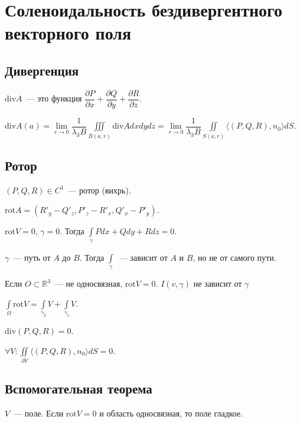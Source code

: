 \documentclass{article}
\begin{document}
    \newpage
    
    \section{Соленоидальность бездивергентного векторного поля}
    
        \subsection{Дивергенция}
    
            $\mathrm{div} A$~--- это функция $\dfrac{\partial P}{\partial x} + \dfrac{\partial Q}{\partial y} + \dfrac{\partial R}{\partial z}$.
        
            $\mathrm{div} A(a) = \lim\limits_{r \rightarrow 0} \dfrac{1}{\lambda_3 B} \iiint\limits_{B(a, r)} \mathrm{div} A dx dy dz = \lim\limits_{r \rightarrow 0} \dfrac{1}{\lambda_3 B} \iint\limits_{S(a, r)} \langle (P, Q, R), n_0 \rangle dS$.
            
        \subsection{Ротор}
    
            $(P, Q, R) \in C^1$~--- ротор (вихрь).
        
            $\mathrm{rot} A = (R'_y - Q'_z, P'_z - R'_x, Q'_x - P'_y)$.
    
        $\mathrm{rot} V = 0$, $\gamma = 0$. Тогда $\int\limits_{\gamma} P dx + Q dy + R dz = 0 $.
        
        $\gamma$~--- путь от $A$ до $B$. Тогда $\int\limits_{\gamma}$~--- зависит от $A$ и $B$, но не от самого пути.
        
        Если $O \subset \mathbb{R}^3$~--- не односвязная, $\mathrm{rot} V = 0$. $I(v, \gamma)$ не зависит от $\gamma$
    
        $\int\limits_{\Omega} \mathrm{rot} V = \int\limits_{\gamma_2} V + \int\limits_{\gamma_1} V$.
    
        $\mathrm{div} (P, Q, R) = 0$.
    
        $\forall V : \iint\limits_{\partial V} \langle (P, Q, R), n_0 \rangle dS = 0$.
    
        \subsection{Вспомогательная теорема}
    
            $V$~--- поле. Если $\mathrm{rot} V = 0$ и область односвязная, то поле гладкое.
    
\end{document}
